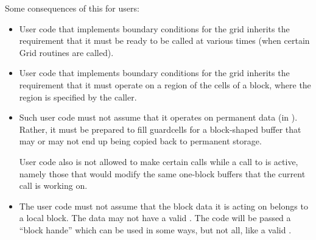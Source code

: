Some consequences of this for \flashx users:
\begin{itemize}
\item
User code that implements boundary conditions for the grid inherits
the requirement that it must be ready to be called at various times
(when certain \unit{Grid} routines are called).
\item
User code that implements boundary conditions for the grid inherits
the requirement that it must operate on a region of the cells of
a block, where the region is specified by the caller.
\item
Such user code must not assume that it operates on permanent data (in  \etc).
Rather, it must be prepared to fill guardcells for a block-shaped buffer
that may or may not end up being copied back to permanent storage.

User code also is not allowed to make certain  calls while
a call to   is active, namely those that
would modify the same one-block buffers that the current call
is working on.
\item
The user code must not assume that the block data it is acting on belongs to
a local block. The data may not have a valid .
The code will be passed a ``block hande'' which can be used
in some ways, but not all, like a valid .
\end{itemize}

